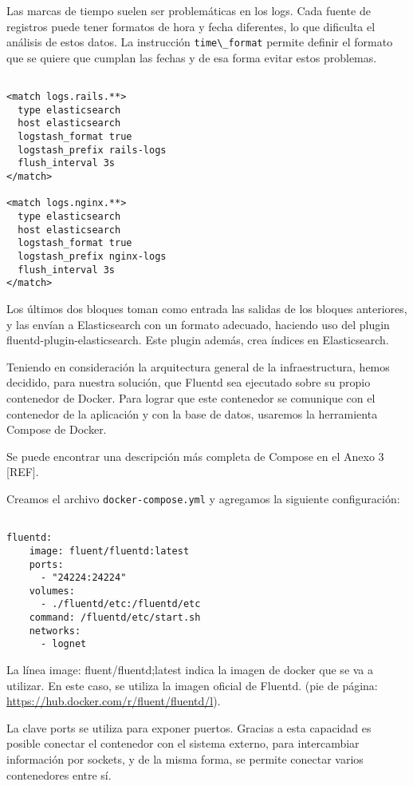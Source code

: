 Las marcas de tiempo suelen ser problemáticas en los logs. Cada fuente de
registros puede tener formatos de hora y fecha diferentes, lo que dificulta el
análisis de estos datos. La instrucción \lstinline{time\_format} permite definir el formato
que se quiere que cumplan las fechas y de esa forma evitar estos problemas.

\begin{lstlisting}
 
<match logs.rails.**>
  type elasticsearch
  host elasticsearch
  logstash_format true
  logstash_prefix rails-logs
  flush_interval 3s
</match>

<match logs.nginx.**>
  type elasticsearch
  host elasticsearch
  logstash_format true
  logstash_prefix nginx-logs
  flush_interval 3s
</match>

\end{lstlisting}

Los últimos dos bloques toman como entrada las salidas de los bloques
anteriores, y las envían a Elasticsearch con un formato adecuado, haciendo uso
del plugin fluentd-plugin-elasticsearch. Este plugin además, crea índices en
Elasticsearch.

Teniendo en consideración la arquitectura general de la infraestructura, hemos
decidido, para nuestra solución, que Fluentd sea ejecutado sobre su propio
contenedor de Docker. Para lograr que este contenedor se comunique con el
contenedor de la aplicación y con la base de datos, usaremos la herramienta
Compose de Docker.

Se puede encontrar una descripción más completa de Compose en el Anexo 3 [REF].

Creamos el archivo \texttt{docker-compose.yml} y agregamos la siguiente configuración:

\begin{lstlisting}

fluentd:
    image: fluent/fluentd:latest
    ports:
      - "24224:24224"
    volumes:
      - ./fluentd/etc:/fluentd/etc
    command: /fluentd/etc/start.sh
    networks:
      - lognet

\end{lstlisting}

La línea image: fluent/fluentd;latest indica la imagen de docker que se va a
utilizar. En este caso, se utiliza la imagen oficial de Fluentd. (pie de
página: \url{https://hub.docker.com/r/fluent/fluentd/l}).

La clave ports se utiliza para exponer puertos. Gracias a esta capacidad es
posible conectar el contenedor con el sistema externo, para intercambiar
información por sockets, y de la misma forma, se permite conectar varios
contenedores entre sí.

